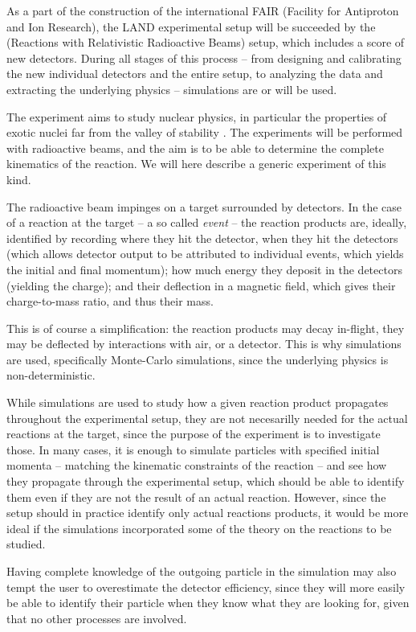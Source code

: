 As a part of the construction of the international FAIR (Facility for Antiproton and Ion Research), the LAND experimental setup will be succeeded by the \rtb{} (Reactions with Relativistic Radioactive Beams) setup, which includes a score of new detectors. During all stages of this process -- from designing and calibrating the new individual detectors and the entire setup, to analyzing the data and extracting the underlying physics -- simulations are or will be used. 

The \rtb{} experiment aims to study nuclear physics, in particular the properties of exotic nuclei far from the valley of stability \cite{r3b:online}. The experiments will be performed with radioactive beams, and the aim is to be able to determine the complete kinematics of the reaction. We will here describe a generic experiment of this kind.

The radioactive beam impinges on a target surrounded by detectors. In the case of a reaction at the target -- a so called \emph{event} -- the reaction products are, ideally, identified by recording where they hit the detector, when they hit the detectors (which allows detector output to be attributed to individual events, which yields the initial and final momentum); how much energy they deposit in the detectors (yielding the charge); and their deflection in a magnetic field, which gives their charge-to-mass ratio, and thus their mass. 

This is of course a simplification: the reaction products may decay in-flight, they may be deflected by interactions with air, or a detector. This is why simulations are used, specifically Monte-Carlo simulations, since the underlying physics is non-deterministic. 

While simulations are used to study how a given reaction product propagates throughout the experimental setup, they are not necesarilly needed for the actual reactions at the target, since the purpose of the experiment is to investigate those. 
In many cases, it is enough to simulate particles with specified initial momenta -- matching the kinematic constraints of the reaction -- and see how they propagate through the experimental setup, which should be able to identify them even if they are not the result of an actual reaction.
However, since the setup should in practice identify only actual reactions products, it would be more ideal if the simulations incorporated some of the theory on the reactions to be studied. 

Having complete knowledge of the outgoing particle in the simulation may also tempt the user to overestimate the detector efficiency, since they will more easily be able to identify their particle when they know what they are looking for, given that no other processes are involved.

